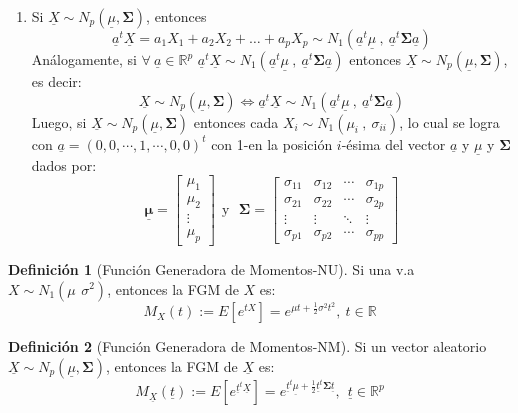 \documentclass[
]{book}
\providecommand{\tightlist}{%
  \setlength{\itemsep}{0pt}\setlength{\parskip}{0pt}}
\theoremstyle{definition}
\newtheorem{definition}{Definición}[chapter]
\theoremstyle{definition}
\theoremstyle{definition}
\theoremstyle{definition}
\theoremstyle{remark}
\begin{document}
\begin{enumerate}
\def\labelenumi{\arabic{enumi}.}
\setcounter{enumi}{1}
\tightlist
\item
  Si \(\underline{X}\sim N_p(\underline{\mu},\mathbf{\Sigma})\), entonces
  \begin{equation}
  \underline{a}^t\underline{X}=a_1X_1+a_2X_2+\ldots+a_pX_p \sim N_1(\underline{a}^t\underline{\mu}\ ,\ \underline{a}^t \mathbf{\Sigma} \underline{a})
  \label{eq:prop-2}
  \end{equation}
  Análogamente, si \(\forall \ \underline{a}\in \mathbb{R}^p\) \(\underline{a}^t\underline{X}\sim N_1(\underline{a}^t\underline{\mu}\ ,\ \underline{a}^t \mathbf{\Sigma} \underline{a})\) entonces \(\underline{X}\sim N_p(\underline{\mu},\mathbf{\Sigma})\), es decir:
  \[
  \underline{X}\sim N_p(\underline{\mu},\mathbf{\Sigma}) \Longleftrightarrow \underline{a}^t \underline{X}\sim N_1(\underline{a}^t\underline{\mu}\ ,\ \underline{a}^t \mathbf{\Sigma} \underline{a})
  \]
  Luego, si \(\underline{X}\sim N_p(\underline{\mu},\mathbf{\Sigma})\) entonces cada \(X_i \sim N_1(\mu_i \ , \  \sigma_{ii})\), lo cual se logra con \(\underline{a}=(0,0,\cdots, 1,\cdots, 0,0)^t\) con 1-en la posición \(i\)-ésima del vector \(\underline{a}\) y \(\underline{\mu}\) y \(\mathbf{\Sigma}\) dados por:
  \[
  \mathbf{\underline{\mu}}=\begin{bmatrix}
  \mu_1\\ \mu_2\\ \vdots \\  \mu_p
  \end{bmatrix} \ \ \text{y} \ \ \ \mathbf{\Sigma}=
  \begin{bmatrix}
  \sigma_{11} & \sigma_{12}& \cdots &  \sigma_{1p}\\
  \sigma_{21} & \sigma_{22}& \cdots &  \sigma_{2p}\\
  \vdots & \vdots & \ddots & \vdots\\
  \sigma_{p1}& \sigma_{p2}& \cdots &  \sigma_{pp}
  \end{bmatrix}
  \]
\end{enumerate}

\begin{definition}[Función Generadora de Momentos-NU]
\protect\hypertarget{def:fgm-normal-uni}{}\label{def:fgm-normal-uni}Si una v.a \(X\sim N_1(\mu \, \ \sigma^2)\), entonces la FGM de \(X\) es:
\[
M_X(t):=E[e^{tX}]=e^{\mu t+\frac{1}{2}\sigma^2 t^2}, \ t\in \mathbb{R}
\]
\end{definition}

\begin{definition}[Función Generadora de Momentos-NM]
\protect\hypertarget{def:fgm-normal-multiv}{}\label{def:fgm-normal-multiv}Si un vector aleatorio \(\underline{X}\sim N_p(\underline{\mu},\mathbf{\Sigma})\), entonces la FGM de \(\underline{X}\) es:
\[
M_{\underline{X}}(\underline{t}):=E[e^{\underline{t}^t\underline{X}}]=e^{\underline{t}^t \underline{\mu} +\frac{1}{2}\underline{t}^t  \mathbf{\Sigma}\underline{t}}, \ \ \underline{t} \in \mathbb{R}^p
\]
\end{definition}
\end{document}
